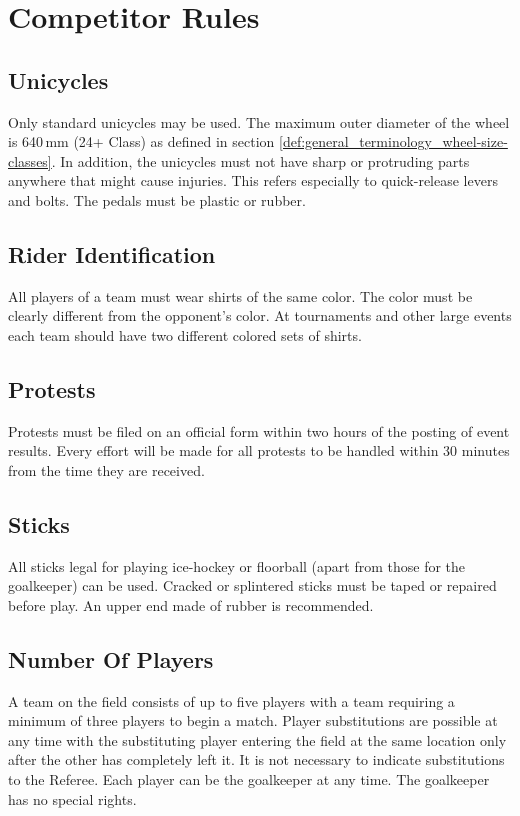 \chapter{Competitor Rules}

\section{Unicycles}

Only standard unicycles may be used.
The maximum outer diameter of the wheel is 640\,mm (24+ Class) as defined in section \ref{def:general_terminology_wheel-size-classes}.
In addition, the unicycles must not have sharp or protruding parts anywhere that might cause injuries.
This refers especially to quick-release levers and bolts.
The pedals must be plastic or rubber.

\section{Rider Identification}

All players of a team must wear shirts of the same color.
The color must be clearly different from the opponent's color.
At tournaments and other large events each team should have two different colored sets of shirts.

\section{Protests}

Protests must be filed on an official form within two hours of the posting of event results.
Every effort will be made for all protests to be handled within 30 minutes from the time they are received.

\section{Sticks}

All sticks legal for playing ice-hockey or floorball (apart from those for the goalkeeper) can be used.
Cracked or splintered sticks must be taped or repaired before play.
An upper end made of rubber is recommended.

\section{Number Of Players}

A team on the field consists of up to five players with a team requiring a minimum of three players to begin a match.
Player substitutions are possible at any time with the substituting player entering the field at the same location only after the other has completely left it.
It is not necessary to indicate substitutions to the Referee.
Each player can be the goalkeeper at any time.
The goalkeeper has no special rights.

